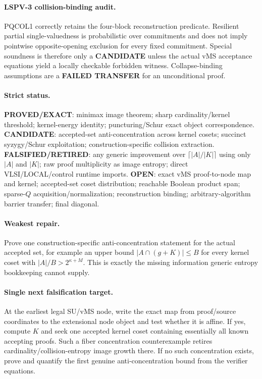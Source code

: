 \documentclass[11pt]{article}
\begin{document}
\paragraph{LSPV-3 collision-binding audit.}
PQCOL1 correctly retains the four-block reconstruction predicate. Resilient partial single-valuedness is probabilistic over commitments and does not imply pointwise opposite-opening exclusion for every fixed commitment. Special soundness is therefore only a \textbf{CANDIDATE} unless the actual vMS acceptance equations yield a locally checkable forbidden witness. Collapse-binding assumptions are a \textbf{FAILED TRANSFER} for an unconditional proof.

\paragraph{Strict status.}
\textbf{PROVED/EXACT}: minimax image theorem; sharp cardinality/kernel threshold; kernel-energy identity; puncturing/Schur exact object correspondence.
\textbf{CANDIDATE}: accepted-set anti-concentration across kernel cosets; succinct syzygy/Schur exploitation; construction-specific collision extraction.
\textbf{FALSIFIED/RETIRED}: any generic improvement over $\lceil|A|/|K|\rceil$ using only $|A|$ and $|K|$; raw proof multiplicity as image entropy; direct VLSI/LOCAL/control runtime imports.
\textbf{OPEN}: exact vMS proof-to-node map and kernel; accepted-set coset distribution; reachable Boolean product span; sparse-$Q$ acquisition/normalization; reconstruction binding; arbitrary-algorithm barrier transfer; final diagonal.

\paragraph{Weakest repair.}
Prove one construction-specific anti-concentration statement for the actual accepted set, for example an upper bound $|A\cap(g+K)|\le B$ for every kernel coset with $|A|/B>2^{\kappa+M}$. This is exactly the missing information generic entropy bookkeeping cannot supply.

\paragraph{Single next falsification target.}
At the earliest legal SU/vMS node, write the exact map from proof/source coordinates to the extensional node object and test whether it is affine. If yes, compute $K$ and seek one accepted kernel coset containing essentially all known accepting proofs. Such a fiber concentration counterexample retires cardinality/collision-entropy image growth there. If no such concentration exists, prove and quantify the first genuine anti-concentration bound from the verifier equations.
\end{document}

